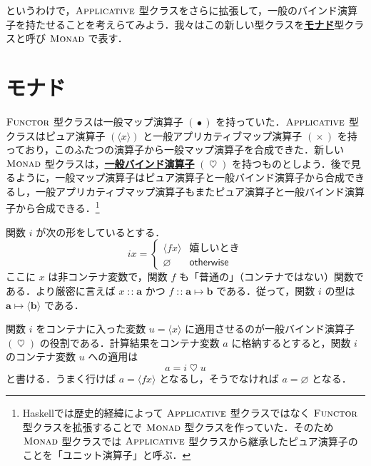 \documentclass[a4paper,twocolumn]{jsbook}
\newcommand{\programminglanguage}[1]{\textsf{#1}}
\newcommand{\haskell}{\programminglanguage{Haskell}}
\newcommand{\keyword}[1]{{\underline{\textbf{#1}}}}
\newcommand{\mKeyword}[1]{\mathsf{#1}} %
\newcommand{\mOtherwiseKeyword}{\mKeyword{otherwise}}
\DeclareMathOperator{\mOtherwise}{\mOtherwiseKeyword}
\newcommand{\mPureNothing}{\varnothing}
\DeclareMathOperator{\mAppMap}{\times}
\DeclareMathOperator{\mBind}{\heartsuit}
\DeclareMathOperator{\mBindMaybe}{\spadesuit}
\DeclareMathOperator{\mIn}{{:\!:}}
\DeclareMathOperator{\mMap}{\bullet}
\DeclareMathOperator{\mMapsTo}{\mapsto}
\newcommand{\mType}[1]{\mathbf{#1}}
\newcommand{\mPureWith}[1]{\langle#1\rangle}
\newcommand{\mPureType}[1]{\mPureWith{\mType{#1}}}
\newcommand{\mSpecialTypeClass}[1]{\textsc{#1}} %
\newcommand{\mApplicativeTypeClass}{\mSpecialTypeClass{Applicative}}
\newcommand{\mFunctorTypeClass}{\mSpecialTypeClass{Functor}}
\newcommand{\mMonadTypeClass}{\mSpecialTypeClass{Monad}}
\newcommand{\mMaybe}[1]{{#1}^\text{?}}
\newcommand{\mProj}[2]{#1\mMapsTo#2}
\begin{document}

というわけで，$\mApplicativeTypeClass$ 型クラスをさらに拡張して，一般のバインド演算子を持たせることを考えらてみよう．我々はこの新しい型クラスを\keyword{モナド}型クラスと呼び $\mMonadTypeClass$ で表す．

\section{モナド}

$\mFunctorTypeClass$ 型クラスは一般マップ演算子 $(\mMap)$ を持っていた．$\mApplicativeTypeClass$ 型クラスはピュア演算子 $(\mPureWith{x})$ と一般アプリカティブマップ演算子 $(\mAppMap)$ を持っており，このふたつの演算子から一般マップ演算子を合成できた．新しい $\mMonadTypeClass$ 型クラスは，\keyword{一般バインド演算子} $(\mBind)$ を持つものとしよう．後で見るように，一般マップ演算子はピュア演算子と一般バインド演算子から合成できるし，一般アプリカティブマップ演算子もまたピュア演算子と一般バインド演算子から合成できる．\footnote{\haskell では歴史的経緯によって $\mApplicativeTypeClass$ 型クラスではなく $\mFunctorTypeClass$ 型クラスを拡張することで $\mMonadTypeClass$ 型クラスを作っていた．そのため $\mMonadTypeClass$ 型クラスでは $\mApplicativeTypeClass$ 型クラスから継承したピュア演算子のことを「ユニット演算子」と呼ぶ．}

関数 $i$ が次の形をしているとする．
\begin{equation}
\label{eq:def-of-i}
ix=\begin{cases}
\mPureWith{fx}&\text{嬉しいとき}\\
\mPureNothing&\mOtherwise
\end{cases}
\end{equation}
ここに $x$ は非コンテナ変数で，関数 $f$ も「普通の」（コンテナではない）関数である．より厳密に言えば $x\mIn\mType{a}$ かつ $f\mIn\mProj{\mType{a}}{\mType{b}}$ である．従って，関数 $i$ の型は $\mProj{\mType{a}}{\mPureType{b}}$ である．

関数 $i$ をコンテナに入った変数 $u=\mPureWith{x}$ に適用させるのが一般バインド演算子 $(\mBind)$ の役割である．計算結果をコンテナ変数 $a$ に格納するとすると，関数 $i$ のコンテナ変数 $u$ への適用は
\begin{equation}
\label{eq:i-love-u}
a=i\mBind u
\end{equation}
と書ける．うまく行けば $a=\mPureWith{fx}$ となるし，そうでなければ $a=\mPureNothing$ となる．
\end{document}
